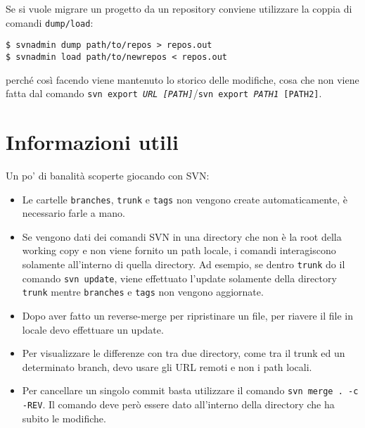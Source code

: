 Se si vuole migrare un progetto da un repository conviene utilizzare la coppia di comandi \texttt{dump/load}:

\begin{lstlisting}
$ svnadmin dump path/to/repos > repos.out
$ svnadmin load path/to/newrepos < repos.out
\end{lstlisting}

perché così facendo viene mantenuto lo storico delle modifiche, cosa che non viene fatta dal comando \texttt{svn export \textit{URL [PATH]}}/\texttt{svn export \textit{PATH1} [PATH2]}.


\section{Informazioni utili}

Un po' di banalità scoperte giocando con SVN:

\begin{itemize}
	\item Le cartelle \texttt{branches}, \texttt{trunk} e \texttt{tags} non vengono create automaticamente, è necessario farle a mano.
	\item Se vengono dati dei comandi SVN in una directory che non è la root della working copy e non viene fornito un path locale, i comandi interagiscono solamente all'interno di quella directory. Ad esempio, se dentro \texttt{trunk} do il comando \texttt{svn update}, viene effettuato l'update solamente della directory \texttt{trunk} mentre \texttt{branches} e \texttt{tags} non vengono aggiornate.
	\item Dopo aver fatto un reverse-merge per ripristinare un file, per riavere il file in locale devo effettuare un update.
	\item Per visualizzare le differenze con tra due directory, come tra il trunk ed un determinato branch, devo usare gli URL remoti e non i path locali.
	\item Per cancellare un singolo commit basta utilizzare il comando \texttt{svn merge . -c -REV}. Il comando deve però essere dato all'interno della directory che ha subito le modifiche. 
\end{itemize}